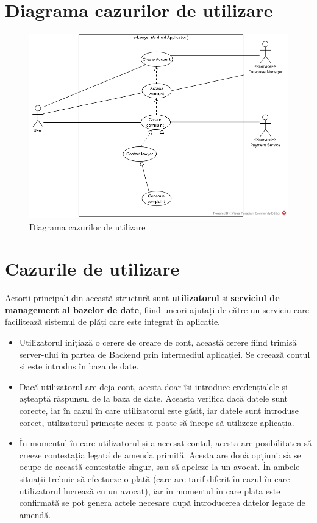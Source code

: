 \documentclass[12pt,a4paper]{report}
\theoremstyle{definition}
\theoremstyle{remark}
\begin{document}
\section{Diagrama cazurilor de utilizare}
\vspace{40pt}
\begin{center}
\begin{figure}[H]
    	\centering
    	\includegraphics[scale=0.6]{images/e-Lawyer Use Case}
	\caption{Diagrama cazurilor de utilizare}
\end{figure}
\end{center}
\section*{Cazurile de utilizare}
Actorii principali din această structură sunt \textbf{utilizatorul} și \textbf{serviciul de management al bazelor de date}, fiind uneori ajutați de către un serviciu care facilitează sistemul de plăți care este integrat în aplicație.
\begin{itemize}
  \item Utilizatorul inițiază o cerere de creare de cont, această cerere fiind trimisă server-ului în partea de Backend prin intermediul aplicației. Se creează contul și este introdus în baza de date.
  \item Dacă utilizatorul are deja cont, acesta doar își introduce credențialele și așteaptă răspunsul de la baza de date. Aceasta verifică dacă datele sunt corecte, iar în cazul în care utilizatorul este găsit, iar datele sunt introduse corect, utilizatorul primește acces și poate să începe să utilizeze aplicația.
  \item În momentul în care utilizatorul și-a accesat contul, acesta are posibilitatea să creeze contestația legată de amenda primită. Acesta are două opțiuni: să se ocupe de această contestație singur, sau să apeleze la un avocat. În ambele situații trebuie să efectueze o plată (care are tarif diferit în cazul în care utilizatorul lucrează cu un avocat), iar în momentul în care plata este confirmată se pot genera actele necesare după introducerea datelor legate de amendă.

\end{itemize}
\newpage
\end{document}
